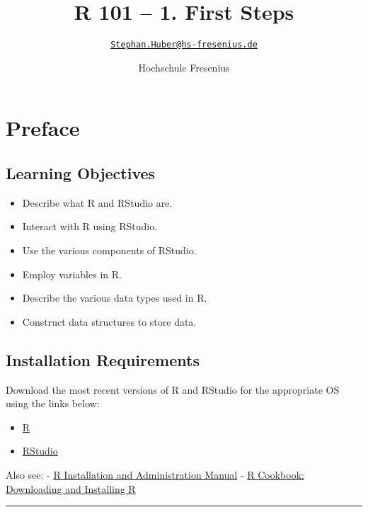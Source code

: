 \documentclass[
]{article}
\title{R 101 -- 1. First Steps}
\author{\href{mailto:Stephan.Huber@hs-fresenius.de}{\nolinkurl{Stephan.Huber@hs-fresenius.de}}}
\date{Hochschule Fresenius}
\providecommand{\tightlist}{%
  \setlength{\itemsep}{0pt}\setlength{\parskip}{0pt}}
\begin{document}
\maketitle

\hypertarget{preface}{%
\section{Preface}\label{preface}}

\hypertarget{learning-objectives}{%
\subsection{Learning Objectives}\label{learning-objectives}}

\begin{itemize}
\tightlist
\item
  Describe what R and RStudio are.
\item
  Interact with R using RStudio.
\item
  Use the various components of RStudio.
\item
  Employ variables in R.
\item
  Describe the various data types used in R.
\item
  Construct data structures to store data.
\end{itemize}

\hypertarget{installation-requirements}{%
\subsection{Installation Requirements}\label{installation-requirements}}

Download the most recent versions of R and RStudio for the appropriate
OS using the links below:

\begin{itemize}
\tightlist
\item
  \href{https://cran.r-project.org/}{R}
\item
  \href{https://www.rstudio.com/products/rstudio/download/\#download}{RStudio}
\end{itemize}

Also see: -
\href{https://cran.r-project.org/doc/manuals/r-release/R-admin.html}{R
Installation and Administration Manual} -
\href{https://rc2e.com/gettingstarted\#recipe-id001}{R Cookbook:
Downloading and Installing R}

\begin{center}\rule{0.5\linewidth}{0.5pt}\end{center}
\end{document}
